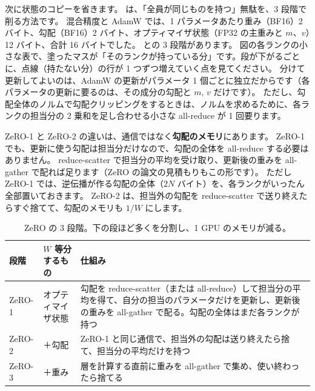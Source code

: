 次に状態のコピーを省きます。
は、「全員が同じものを持つ」無駄を、3 段階で削る方法です\cite{rajbhandari2020zero}。
混合精度と AdamW では、1 パラメータあたり重み（BF16）2 バイト、勾配（BF16）2 バイト、オプティマイザ状態（FP32 の主重みと $m$、$v$）12 バイト、合計 16 バイトでした。
との 3 段階があります。
図の各ランクの小さな表で、塗ったマスが「そのランクが持っている分」です。段が下がるごとに、点線（持たない分）の行が 1 つずつ増えていく点を見てください。
分けて更新してよいのは、AdamW の更新がパラメータ 1 個ごとに独立だからです（各パラメータの更新に要るのは、その成分の勾配と $m$, $v$ だけです）。
ただし、勾配全体のノルムで勾配クリッピングをするときは、ノルムを求めるために、各ランクの担当分の 2 乗和を足し合わせる小さな all-reduce が 1 回要ります。

ZeRO-1 と ZeRO-2 の違いは、通信ではなく\textbf{勾配のメモリ}にあります。
ZeRO-1 でも、更新に使う勾配は担当分だけなので、勾配の全体を all-reduce する必要はありません。
reduce-scatter で担当分の平均を受け取り、更新後の重みを all-gather で配れば足ります（ZeRO の論文の見積もりもこの形です）。
ただし ZeRO-1 では、逆伝播が作る勾配の全体（$2N$ バイト）を、各ランクがいったん全部置いておきます。
ZeRO-2 は、担当外の勾配を reduce-scatter で送り終えたらすぐ捨てて、勾配のメモリも $1/W$ にします。

\begin{table}[tbp]
\centering
\caption{ZeRO の 3 段階。下の段ほど多くを分割し、1 GPU のメモリが減る。}
\label{tab:dist-zero-stages}
\small
\begin{tabular}{lp{30mm}p{66mm}}
\toprule
段階 & $W$ 等分するもの & 仕組み \\
\midrule
ZeRO-1 & オプティマイザ状態 & 勾配を reduce-scatter（または all-reduce）して担当分の平均を得て、自分の担当のパラメータだけを更新し、更新後の重みを all-gather で配る。勾配の全体はまだ各ランクが持つ \\
ZeRO-2 & ＋勾配 & ZeRO-1 と同じ通信で、担当外の勾配は送り終えたら捨て、担当分の平均だけを持つ \\
ZeRO-3 & ＋重み & 層を計算する直前に重みを all-gather で集め、使い終わったら捨てる \\
\bottomrule
\end{tabular}
\end{table}

